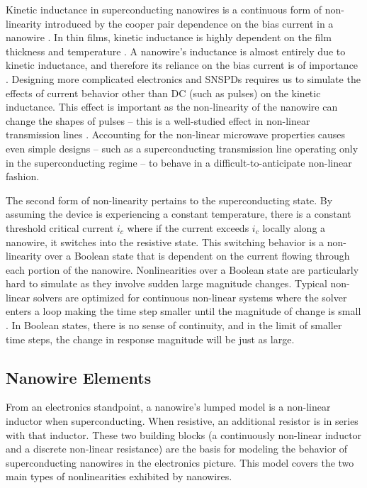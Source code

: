 Kinetic inductance in superconducting nanowires is a continuous form of non-linearity introduced by the 
cooper pair dependence on the bias current in a nanowire \cite{inductance_nonlinearity}. In thin films, kinetic inductance is highly dependent on the film thickness
and temperature \cite{dizhu-thesis}. 
A nanowire's inductance is almost entirely due to kinetic inductance, and therefore
its reliance on the bias current is of importance \cite{kinetic_inductance_majority_of_nw}.
Designing more complicated electronics and SNSPDs  requires
us to simulate the effects of current behavior other than DC (such as pulses)
on the kinetic inductance. This effect is important as 
the non-linearity of the nanowire can change the shapes of pulses -- this is a well-studied effect in non-linear transmission lines \cite{nl_tline_reshape}. 
Accounting for the non-linear microwave properties causes even simple designs 
-- such as a superconducting transmission line operating only in the superconducting regime -- to 
behave in a difficult-to-anticipate non-linear fashion. 

The second form of non-linearity pertains to the superconducting state. By assuming the device is
experiencing a constant temperature, there is a constant threshold critical current
$i_c$ where if the current exceeds $i_c$ locally along a nanowire, it switches into the resistive state. This switching behavior is a non-linearity
over a Boolean state that is dependent on the current flowing through each portion of the nanowire.
Nonlinearities over a Boolean state are particularly hard to simulate as they involve sudden large
magnitude changes. Typical non-linear solvers are optimized for continuous non-linear systems where
the solver enters a loop making the time step smaller until the magnitude of change is small \cite{spice-book, hspice}.
In Boolean states, there is no sense of continuity, and in the limit of smaller time steps, the 
change in response magnitude will be just as large. 

\subsection{Nanowire Elements}

From an electronics standpoint, a nanowire's lumped model is a non-linear inductor when superconducting. When resistive, an additional resistor is in series with that inductor.
These two building blocks (a continuously non-linear inductor and a discrete non-linear
resistance) are the basis for modeling the behavior of superconducting nanowires in
the electronics picture. This model covers the two main types of nonlinearities
exhibited by nanowires.

